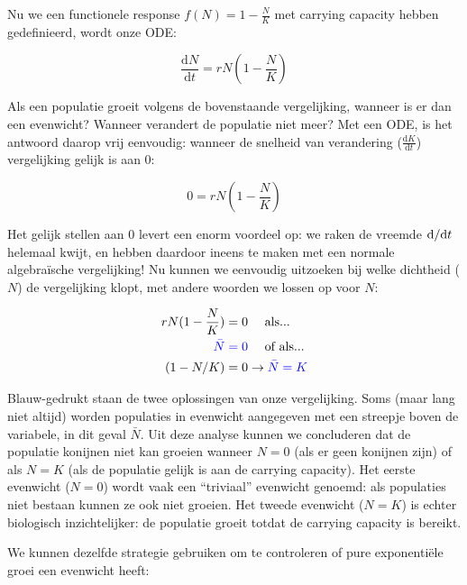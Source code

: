 \documentclass[
  a4paper,
]{scrbook}
\theoremstyle{definition}
\theoremstyle{remark}
\begin{document}
Nu we een functionele response \(f(N) = 1-\frac{N}{K}\) met carrying
capacity hebben gedefinieerd, wordt onze ODE:

\begin{equation}
    \frac{\mathrm{d}N}{\mathrm{d}t} = rN (1-\frac{N}{K})
\end{equation}

Als een populatie groeit volgens de bovenstaande vergelijking, wanneer
is er dan een evenwicht? Wanneer verandert de populatie niet meer? Met
een ODE, is het antwoord daarop vrij eenvoudig: wanneer de snelheid van
verandering (\(\frac{\mathrm{d}K}{\mathrm{d}t}\)) vergelijking gelijk is
aan 0:

\begin{equation}
    0 = rN (1-\frac{N}{K})
\end{equation}

Het gelijk stellen aan \(0\) levert een enorm voordeel op: we raken de
vreemde \(\mathchoice{\frac{\mathrm{d} }
{\mathrm{d}t}}{\mathrm{d} /\mathrm{d}t}
{\mathrm{d} /\mathrm{d}t}
{\mathrm{d} /\mathrm{d}t}\) helemaal kwijt, en hebben daardoor ineens te
maken met een normale algebraïsche vergelijking! Nu kunnen we eenvoudig
uitzoeken bij welke dichtheid (\(N\)) de vergelijking klopt, met andere
woorden we lossen op voor \(N\):

\begin{align*}
    rN (1-\frac{N}{K}) &= 0 \quad \text{ als...}\\
    \color{blue} \bar{N} & \color{blue} = 0  \color{black} \quad \text{ of als...}\\
    (1-N/K) &= 0 \rightarrow \color{blue} \bar{N}=K \\
\end{align*}

Blauw-gedrukt staan de twee oplossingen van onze vergelijking. Soms
(maar lang niet altijd) worden populaties in evenwicht aangegeven met
een streepje boven de variabele, in dit geval \(\bar{N}\). Uit deze
analyse kunnen we concluderen dat de populatie konijnen niet kan groeien
wanneer \(N=0\) (als er geen konijnen zijn) of als \(N=K\) (als de
populatie gelijk is aan de carrying capacity). Het eerste evenwicht
(\(N=0\)) wordt vaak een ``triviaal'' evenwicht genoemd: als populaties
niet bestaan kunnen ze ook niet groeien. Het tweede evenwicht (\(N=K\))
is echter biologisch inzichtelijker: de populatie groeit totdat de
carrying capacity is bereikt.

We kunnen dezelfde strategie gebruiken om te controleren of pure
exponentiële groei een evenwicht heeft:
\end{document}
